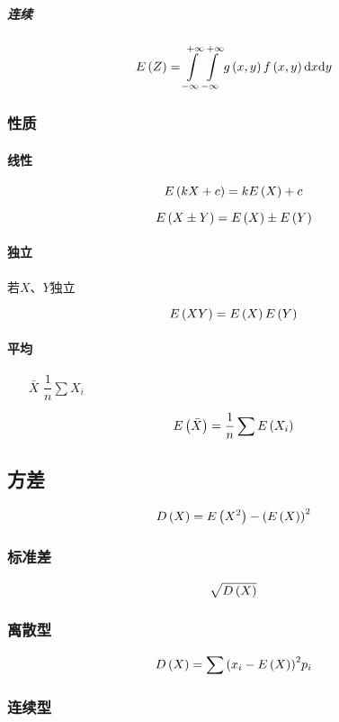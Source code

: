 \documentclass{article}
\begin{document}
\subparagraph{连续}

\[E\left(Z\right)=\int\limits_{-\infty}^{+\infty}\int\limits_{-\infty}^{+\infty} g\left(x,y\right)f\left(x,y\right)\mathrm d x\mathrm d y\]

\subsubsection{性质}

\paragraph{线性}

\[E\left(kX+c\right)=kE\left(X\right)+c\]

\[E\left(X\pm Y\right)=E\left(X\right)\pm E\left(Y\right)\]

\paragraph{独立}

若$X$、$Y$独立

\[E\left(XY\right)=E\left(X\right)E\left(Y\right)\]

\paragraph{平均}

\begin{enumerate}
    \item [$\bar X$]$\dfrac1n\sum X_i$
\end{enumerate}

\[E\left(\bar X\right)=\frac1n\sum E\left(X_i\right)\]

\subsection{方差}

\[D\left(X\right)=E\left(X^2\right)-{\left(E\left(X\right)\right)}^2\]

\subsubsection{标准差}

\[\sqrt{D\left(X\right)}\]

\subsubsection{离散型}

\[D\left(X\right)=\sum{\left(x_i-E\left(X\right)\right)}^2p_i\]

\subsubsection{连续型}
\end{document}
